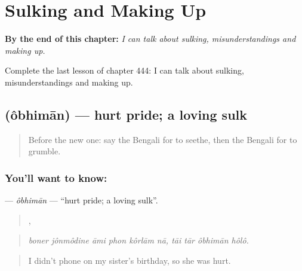 
\chapter{Sulking and Making Up}
\label{ch:bn-sulking-and-making-up}

\begin{chapteropening}
\textbf{By the end of this chapter:} \emph{I can talk about sulking, misunderstandings and making up.}

Complete the last lesson of chapter 444: I can talk about sulking, misunderstandings and making up.
\end{chapteropening}

\section[\texorpdfstring{\bn{অভিমান} (ôbhimān)}{অভিমান (ôbhimān)}]{ (ôbhimān) — hurt pride; a loving sulk}

\label{lesson:BN-C444-obhiman}



\begin{quote}
Before the new one: say the Bengali for to seethe, then the Bengali for to grumble.
\end{quote}

\subsection*{You'll want to know: }
\textbf{} — \emph{ôbhimān} — \textquotedblleft{}hurt pride; a loving sulk\textquotedblright{}.

\begin{quote}
     ,    
\end{quote}

\begin{quote}
\emph{boner jônmôdine āmi phon kôrlām nā, tāi tār ôbhimān hôlô.}
\end{quote}

\begin{quote}
I didn't phone on my sister's birthday, so she was hurt.
\end{quote}

